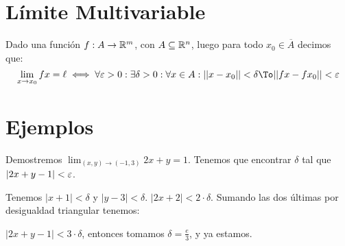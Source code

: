 \documentclass{article}
\begin{document}
\section{Límite Multivariable}
Dado una función $f : A \to \mathbb{R}^m$, con $A \subseteq \mathbb{R}^n$, luego para todo
$x_0 \in \overline{A}$ decimos que:
\[\lim_{x \to x_0} fx = \ell \iff \forall \e>0 : \exists \delta > 0 :
\forall x \in A : ||x - x_0|| < \delta \To ||fx - fx_0|| < \e\]

\section{Ejemplos}
Demostremos $\lim_{(x, y) \to (-1, 3)} 2x + y = 1$. Tenemos que encontrar
$\delta$ tal que $|2x + y - 1| < \varepsilon$.

Tenemos $|x+1| < \delta$ y $|y-3| < \delta$.
$|2x+2| <2 \cdot  \delta$. Sumando las dos últimas por desigualdad triangular tenemos:

$|2x + y - 1| < 3 \cdot \delta$, entonces tomamos $\delta = \frac{e}{3}$, y ya estamos.
\end{document}
